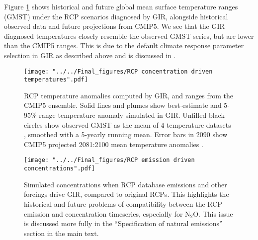 \documentclass[gmd, manuscript]{copernicus}
\begin{document}
\clearpage
Figure \ref{fig:RCPtemps} shows historical and future global mean surface temperature ranges (GMST) under the RCP scenarios diagnosed by GIR, alongside historical observed data and future projections from CMIP5. We see that the GIR diagnosed temperatures closely resemble the observed GMST series, but are lower than the CMIP5 ranges. This is due to the default climate response parameter selection in GIR as described above and is discussed in \cite{Richardson2016}.
\begin{figure}[t]
    \texttt{[image: "../../Final\_figures/RCP concentration driven temperatures".pdf]}
    \caption{RCP temperature anomalies computed by GIR, and ranges from the CMIP5 ensemble. Solid lines and plumes show best-estimate and 5-95\% range temperature anomaly simulated in GIR. Unfilled black circles show observed GMST as the mean of 4 temperature datasets \citep{Vose2012,Cowtan2014,Lenssen2019,Morice2011}, smoothed with a 5-yearly running mean. Error bars in 2090 show CMIP5 projected 2081:2100 mean temperature anomalies \citep{Collins2013}.}
    \label{fig:RCPtemps}
\end{figure}
\clearpage
\begin{figure}[t]
    \texttt{[image: "../../Final\_figures/RCP emission driven concentrations".pdf]}
    \caption{Simulated concentrations when RCP database emissions and other forcings drive GIR, compared to original RCPs. This highlights the historical and future problems of compatibility between the RCP emission and concentration timeseries, especially for N$_2$O. This issue is discussed more fully in the ``Specification of natural emissions'' section in the main text.}
    \label{fig:RCPconcs}
\end{figure}
\clearpage






\end{document}
